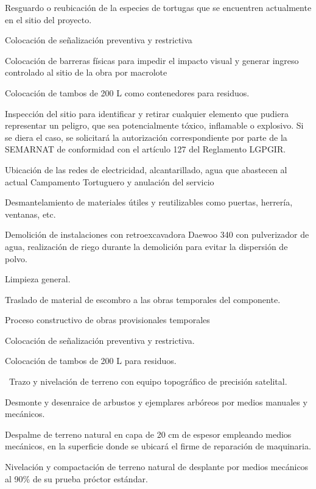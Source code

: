 \documentclass{article}
\begin{document}
\bigskip

Resguardo o reubicación de la especies de tortugas que se encuentren actualmente en el sitio del proyecto. 

Colocación de señalización preventiva y restrictiva

Colocación de barreras físicas para impedir el impacto visual y generar ingreso controlado al sitio de la obra por macrolote

Colocación de tambos de 200 L como contenedores para residuos.

Inspección del sitio para identificar y retirar cualquier elemento que pudiera representar un peligro, que sea potencialmente tóxico, inflamable o explosivo. Si se diera el caso, se solicitará la autorización correspondiente por parte de la SEMARNAT de conformidad con el artículo 127 del Reglamento LGPGIR.

Ubicación de las redes de electricidad, alcantarillado, agua que abastecen al actual Campamento Tortuguero y anulación del servicio 

Desmantelamiento de materiales útiles y reutilizables como puertas, herrería, ventanas, etc.

Demolición de instalaciones con retroexcavadora Daewoo 340 con pulverizador de agua, realización de riego durante la demolición para evitar la dispersión de polvo.

Limpieza general.

Traslado de material de escombro a las obras temporales del componente.


\bigskip


\bigskip

Proceso constructivo de obras provisionales temporales


\bigskip

Colocación de señalización preventiva y restrictiva.

Colocación de tambos de 200 L para residuos.

\ Trazo y nivelación de terreno con equipo topográfico de precisión satelital.

Desmonte y desenraice de arbustos y ejemplares arbóreos por medios manuales y mecánicos.

Despalme de terreno natural en capa de 20 cm de espesor empleando medios mecánicos, en la superficie donde se ubicará el firme de reparación de maquinaria.

Nivelación y compactación de terreno natural de desplante por medios mecánicos al 90\% de su prueba próctor estándar.
\end{document}
